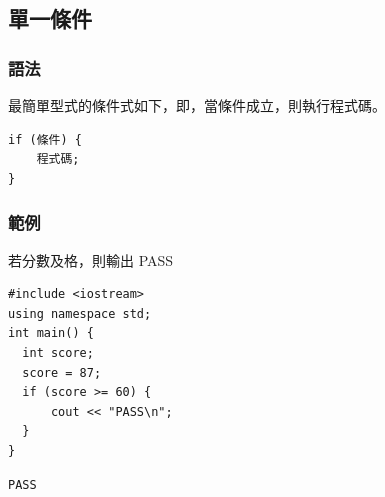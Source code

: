 \documentclass[12pt,a4paper]{article}
\begin{document}
\subsection{單一條件}
\label{sec:org6db8e12}
\subsubsection{語法}
\label{sec:orgf0e56fe}
最簡單型式的條件式如下，即，當條件成立，則執行程式碼。
\lstset{breaklines=true,language=cpp,label= ,caption= ,captionpos=b,numbers=none}
\begin{lstlisting}
if (條件) {
    程式碼;
}
\end{lstlisting}

\subsubsection{範例}
\label{sec:org4f3e54e}
若分數及格，則輸出 PASS
\lstset{breaklines=true,language=cpp,label= ,caption= ,captionpos=b,firstnumber=1,numbers=left}
\begin{lstlisting}
#include <iostream>
using namespace std;
int main() {
  int score;
  score = 87;
  if (score >= 60) {
      cout << "PASS\n";
  }
}
\end{lstlisting}

\begin{verbatim}
PASS
\end{verbatim}
\end{document}
